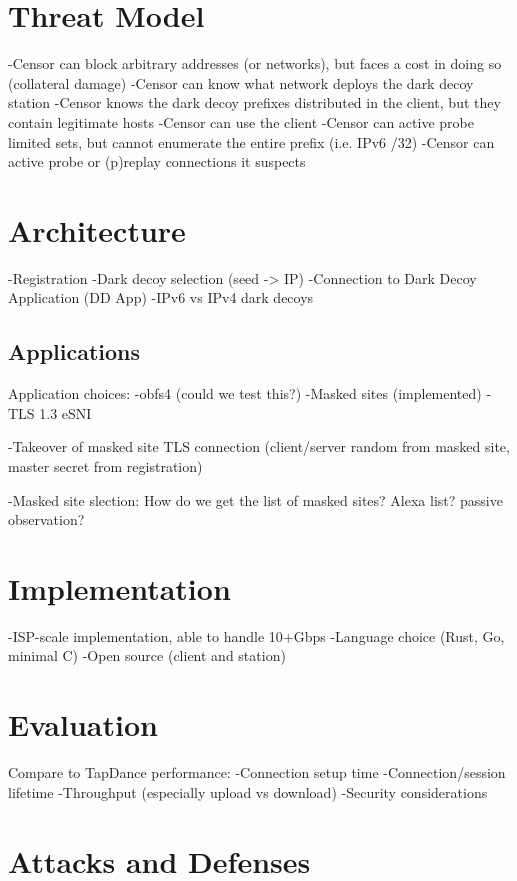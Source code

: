 \documentclass[letterpaper,twocolumn,10pt]{article}
\begin{document}
\section{Threat Model}

-Censor can block arbitrary addresses (or networks), but faces a cost in doing so (collateral damage)
-Censor can know what network deploys the dark decoy station
-Censor knows the dark decoy prefixes distributed in the client, but they contain legitimate hosts
-Censor can use the client
-Censor can active probe limited sets, but cannot enumerate the entire prefix (i.e. IPv6 /32)
-Censor can active probe or (p)replay connections it suspects


\section{Architecture}
-Registration
-Dark decoy selection (seed -> IP)
-Connection to Dark Decoy Application (DD App)
-IPv6 vs IPv4 dark decoys

\subsection{Applications}

Application choices:
-obfs4  (could we test this?)
-Masked sites (implemented)
-TLS 1.3 eSNI

-Takeover of masked site TLS connection (client/server random from masked site, master secret from registration)

-Masked site slection: How do we get the list of masked sites? Alexa list? passive observation?

\section{Implementation}

-ISP-scale implementation, able to handle 10+Gbps
-Language choice (Rust, Go, minimal C)
-Open source (client and station)

\section{Evaluation}

Compare to TapDance performance:
-Connection setup time
-Connection/session lifetime
-Throughput (especially upload vs download)
-Security considerations

\section{Attacks and Defenses}
\end{document}
